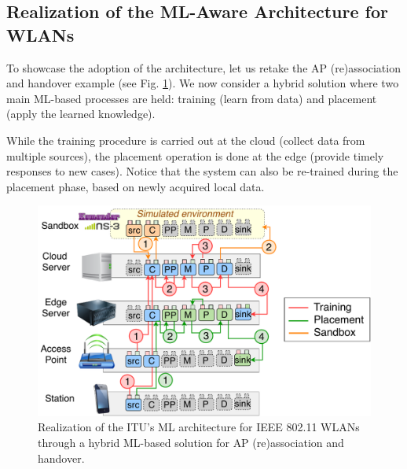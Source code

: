 \documentclass[journal]{IEEEtran}
\begin{document}
\subsection{Realization of the ML-Aware Architecture for WLANs}

To showcase the adoption of the architecture, let us retake the AP (re)association and handover example (see Fig. \ref{fig:ml_architecture_wlan}). We now consider a hybrid solution where two main ML-based processes are held: training (learn from data) and placement (apply the learned knowledge). 

While the training procedure is carried out at the cloud (collect data from multiple sources), the placement operation is done at the edge (provide timely responses to new cases). Notice that the system can also be re-trained during the placement phase, based on newly acquired local data.

\begin{figure}[ht!]
	\includegraphics[width=1\columnwidth]{ml_architecture_wlan_2}
	\caption{Realization of the ITU's ML architecture for IEEE 802.11 WLANs through a hybrid ML-based solution for AP (re)association and handover.}
	\label{fig:ml_architecture_wlan}
\end{figure}
\end{document}
